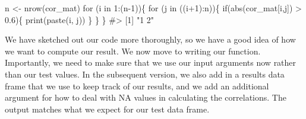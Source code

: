 \documentclass[
  letterpaper,
]{latex/krantz}
\makeatletter
\newenvironment{Shaded}{\begin{snugshade}}{\end{snugshade}}
\newcommand{\CommentTok}[1]{\textcolor[rgb]{0.37,0.37,0.37}{#1}}
\newcommand{\ControlFlowTok}[1]{\textcolor[rgb]{0.00,0.23,0.31}{#1}}
\newcommand{\DecValTok}[1]{\textcolor[rgb]{0.68,0.00,0.00}{#1}}
\newcommand{\FloatTok}[1]{\textcolor[rgb]{0.68,0.00,0.00}{#1}}
\newcommand{\FunctionTok}[1]{\textcolor[rgb]{0.28,0.35,0.67}{#1}}
\newcommand{\NormalTok}[1]{\textcolor[rgb]{0.00,0.23,0.31}{#1}}
\newcommand{\OtherTok}[1]{\textcolor[rgb]{0.00,0.23,0.31}{#1}}
\newcommand{\SpecialCharTok}[1]{\textcolor[rgb]{0.37,0.37,0.37}{#1}}
\newenvironment{kframe}{%
\medskip{}
\setlength{\fboxsep}{.8em}
 \def\at@end@of@kframe{}%
 \ifinner\ifhmode%
  \def\at@end@of@kframe{\end{minipage}}%
  \begin{minipage}{\columnwidth}%
 \fi\fi%
 \def\FrameCommand##1{\hskip\@totalleftmargin \hskip-\fboxsep
 \colorbox{shadecolor}{##1}\hskip-\fboxsep
     \hskip-\linewidth \hskip-\@totalleftmargin \hskip\columnwidth}%
 \MakeFramed {\advance\hsize-\width
   \@totalleftmargin\z@ \linewidth\hsize
   \@setminipage}}%
 {\par\unskip\endMakeFramed%
 \at@end@of@kframe}
\renewenvironment{Shaded}{\begin{kframe}}{\end{kframe}}
\makeatother
\begin{document}
\begin{Shaded}
\begin{Highlighting}[]
\NormalTok{n }\OtherTok{\textless{}{-}} \FunctionTok{nrow}\NormalTok{(cor\_mat)}
\ControlFlowTok{for}\NormalTok{ (i }\ControlFlowTok{in} \DecValTok{1}\SpecialCharTok{:}\NormalTok{(n}\DecValTok{{-}1}\NormalTok{))\{}
  \ControlFlowTok{for}\NormalTok{ (j }\ControlFlowTok{in}\NormalTok{ ((i}\SpecialCharTok{+}\DecValTok{1}\NormalTok{)}\SpecialCharTok{:}\NormalTok{n))\{}
    \ControlFlowTok{if}\NormalTok{(}\FunctionTok{abs}\NormalTok{(cor\_mat[i,j]) }\SpecialCharTok{\textgreater{}} \FloatTok{0.6}\NormalTok{)\{}
      \FunctionTok{print}\NormalTok{(}\FunctionTok{paste}\NormalTok{(i, j))}
\NormalTok{    \}}
\NormalTok{  \}}
\NormalTok{\}}
\CommentTok{\#\textgreater{} [1] "1 2"}
\end{Highlighting}
\end{Shaded}

We have sketched out our code more thoroughly, so we have a good idea of
how we want to compute our result. We now move to writing our function.
Importantly, we need to make sure that we use our input arguments now
rather than our test values. In the subsequent version, we also add in a
results data frame that we use to keep track of our results, and we add
an additional argument for how to deal with NA values in calculating the
correlations. The output matches what we expect for our test data frame.
\end{document}
